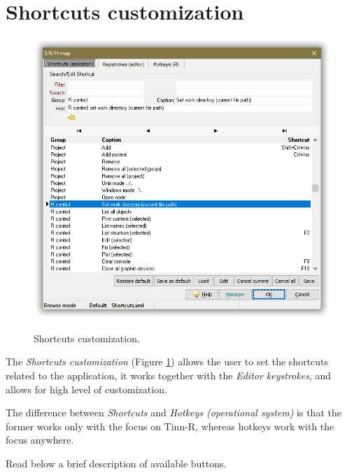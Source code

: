 
\hypertarget{working_shortcuts}{}
\section{Shortcuts customization}

\begin{figure}[H]
  \includegraphics[scale=0.40]{./res/shortcuts_dlg.png}\\
  \caption{Shortcuts customization.}
  \label{fig:shortcuts_dlg_1}
\end{figure}

The \textit{Shortcuts customization}
(Figure \ref{fig:shortcuts_dlg_1})
allows the user to set the shortcuts related
to the application, it works together with the \textit{Editor keystrokes},
and allows for high level of customization.

The difference between \textit{Shortcuts} and \textit{Hotkeys (operational system)}
is that the former works only with the focus on Tinn-R, whereas hotkeys work
with the focus anywhere.

Read below a brief description of available buttons.

